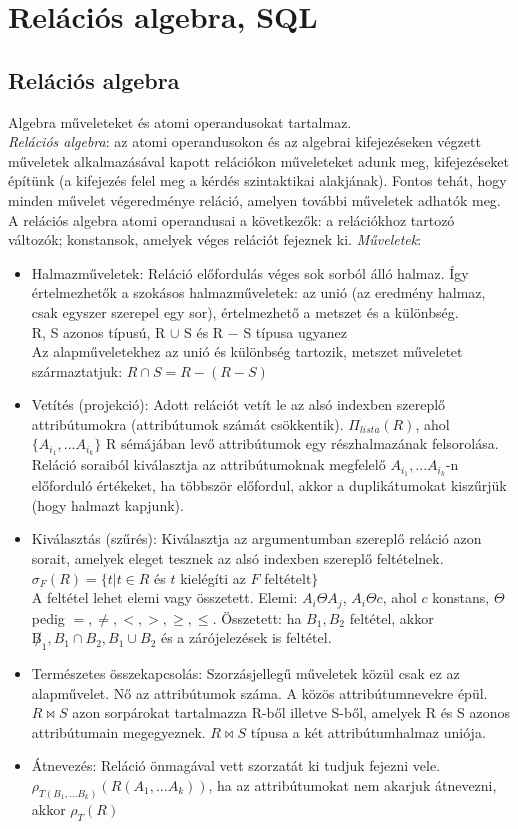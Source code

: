 \documentclass[margin=0px]{article}
\begin{document}
\section{Relációs algebra, SQL}

\subsection{Relációs algebra}

Algebra műveleteket és atomi operandusokat tartalmaz. \\
\textit{Relációs algebra}: az atomi operandusokon és az algebrai kifejezéseken végzett műveletek alkalmazásával kapott relációkon műveleteket adunk meg, kifejezéseket építünk (a kifejezés felel meg a kérdés szintaktikai alakjának). Fontos tehát, hogy minden művelet végeredménye reláció, amelyen további műveletek adhatók meg. A relációs algebra atomi operandusai a következők: a relációkhoz tartozó változók; konstansok, amelyek véges relációt fejeznek ki.
\textit{Műveletek}:
\begin{itemize}
    \item Halmazműveletek: Reláció előfordulás véges sok sorból álló halmaz. Így értelmezhetők a szokásos halmazműveletek: az unió (az eredmény halmaz, csak egyszer szerepel egy sor), értelmezhető a metszet és a különbség. \\
          R, S azonos típusú, R $\cup$ S és R $-$ S típusa ugyanez \\
          Az alapműveletekhez az unió és különbség tartozik, metszet műveletet származtatjuk: $R \cap S = R - (R - S)$
    \item Vetítés (projekció): Adott relációt vetít le az alsó indexben szereplő attribútumokra (attribútumok számát csökkentik). $\Pi_{lista}(R)$, ahol $\{A_{i_1},...A_{i_k}\}$ R sémájában levő attribútumok egy részhalmazának felsorolása. Reláció soraiból kiválasztja az attribútumoknak megfelelő $A_{i_1},...A_{i_k}$-n előforduló értékeket, ha többször előfordul, akkor a duplikátumokat kiszűrjük (hogy halmazt kapjunk).
    \item Kiválasztás (szűrés): Kiválasztja az argumentumban szereplő reláció azon sorait, amelyek eleget tesznek az alsó indexben szereplő feltételnek. $\sigma_F(R) = \{t|t \in R$ és $t$ kielégíti az $F$ feltételt$\}$ \\
          A feltétel lehet elemi vagy összetett. Elemi: $A_i \Theta A_j$, $A_i \Theta c$, ahol $c$ konstans, $\Theta$ pedig $=, \neq, <, >, \geq, \leq$. Összetett: ha $B_1, B_2$ feltétel, akkor $\not B_1, B_1 \cap B_2, B_1 \cup B_2$ és a zárójelezések is feltétel.
    \item Természetes összekapcsolás: Szorzásjellegű műveletek közül csak ez az alapművelet. Nő az attribútumok száma. A közös attribútumnevekre épül. $R \bowtie S$ azon sorpárokat tartalmazza R-ből illetve S-ből, amelyek R és S azonos attribútumain megegyeznek. $R \bowtie S$ típusa a két attribútumhalmaz uniója.
    \item Átnevezés: Reláció önmagával vett szorzatát ki tudjuk fejezni vele. $\rho_{T(B_1,...B_k)}(R(A_1,...A_k))$, ha az attribútumokat nem akarjuk átnevezni, akkor $\rho_{T}(R)$
\end{itemize}
\end{document}
